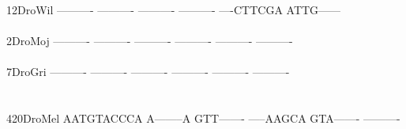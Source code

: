 \documentclass[11pt,twoside,reqno,a4paper]{article}
\begin{document}
{12\hspace*{3\charwidth}DroWil	----------	----------	----------	----------	----CTTCGA	ATTG------	\\
\hspace*{5\charwidth}\hspace*{7\charwidth}\hspace*{1\charwidth}\hspace*{1\charwidth}\hspace*{1\charwidth}\hspace*{1\charwidth}\hspace*{1\charwidth}\hspace*{1\charwidth}\\
2\hspace*{4\charwidth}DroMoj	----------	----------	----------	----------	----------	----------	\\
\hspace*{5\charwidth}\hspace*{7\charwidth}\hspace*{1\charwidth}\hspace*{1\charwidth}\hspace*{1\charwidth}\hspace*{1\charwidth}\hspace*{1\charwidth}\hspace*{1\charwidth}\\
7\hspace*{4\charwidth}DroGri	----------	----------	----------	----------	----------	----------	\\
\hspace*{5\charwidth}\hspace*{7\charwidth}\hspace*{1\charwidth}\hspace*{1\charwidth}\hspace*{1\charwidth}\hspace*{1\charwidth}\hspace*{1\charwidth}\hspace*{1\charwidth}\\
\\
420\hspace*{2\charwidth}DroMel	AATGTACCCA	A--------A	GTT-------	-----AAGCA	GTA-------	----------	\\
\hspace*{5\charwidth}\hspace*{7\charwidth}\hspace*{1\charwidth}\hspace*{1\charwidth}\hspace*{1\charwidth}\hspace*{1\charwidth}\hspace*{1\charwidth}\hspace*{1\charwidth}\\
}
\end{document}
